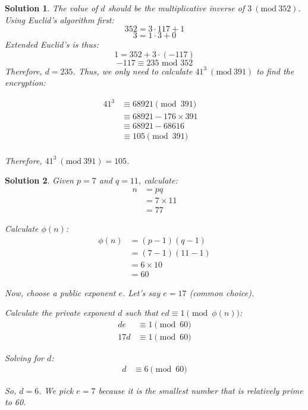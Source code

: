 \documentclass[boxes]{rutgers_hw}
\author{Rohan Karamel} %
\date{\today} %
\newcommand{\Mod}[1]{\ (\mathrm{mod}\ #1)}
\newtheorem*{solutions}{Solution}
\begin{document}
\maketitle

\begin{exern}{1.27}
\end{exern}
\begin{solutions}
    The value of $d$ should be the multiplicative inverse of $3 \Mod{352}$.
    Using Euclid's algorithm first:
    \[352 = 3\cdot 117 + 1\]
    \[3 = 1 \cdot 3 + 0\]
    Extended Euclid's is thus:
    \[1 = 352 + 3\cdot (-117)\]
    \[-117 \equiv 235 \text{ mod } 352\]
    Therefore, $d = 235$. Thus, we only need to calculate $41^3 \Mod{391}$ to find the encryption:

    \begin{align*}
        41^3 &\equiv 68921 \pmod{391} \\
        &\equiv 68921 - 176 \times 391 \quad \\
        &\equiv 68921 - 68616 \\
        &\equiv 105 \pmod{391} \\
    \end{align*}
    
    Therefore, \(41^3 \Mod {391} = 105\).
    
\end{solutions}

\pagebreak

\begin{exern}{1.28}
\end{exern}
\begin{solutions}
    Given \(p = 7\) and \(q = 11\), calculate:
    \begin{align*}
        n &= pq \\
        &= 7 \times 11 \\
        &= 77
    \end{align*}

    Calculate \(\phi(n)\):
    \begin{align*}
        \phi(n) &= (p-1)(q-1) \\
        &= (7-1)(11-1) \\
        &= 6 \times 10 \\
        &= 60
    \end{align*}

    Now, choose a public exponent \(e\). Let's say \(e = 17\) (common choice).

    Calculate the private exponent \(d\) such that \(ed \equiv 1 \pmod{\phi(n)}\):
    \begin{align*}
        de &\equiv 1 \pmod{60} \\
        17d &\equiv 1 \pmod{60}
    \end{align*}

    Solving for \(d\):
    \begin{align*}
        d &\equiv 6 \pmod{60}
    \end{align*}

    So, $d = 6$.
    We pick $e = 7$ because it is the smallest number that is relatively prime to 60.
\end{solutions}
\end{document}
